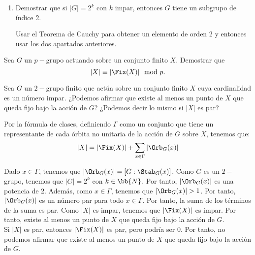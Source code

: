 \begin{ejercicio}
\begin{enumerate}
        
        \item Demostrar que si $|G| = 2^k$ con $k$ impar, entonces $G$ tiene un subgrupo de índice 2.
        \begin{observacion}
            Usar el Teorema de Cauchy para obtener un elemento de orden 2 y entonces usar los dos apartados anteriores.
        \end{observacion}
    \end{enumerate}

\end{ejercicio}

\begin{ejercicio}\label{ej:6.12}
    Sea $G$ un $p-$grupo actuando sobre un conjunto finito $X$. Demostrar que
    \[
        |X| \equiv |\Fix(X)| \mod p.
    \]

\end{ejercicio}

\begin{ejercicio}
    Sea $G$ un $2-$grupo finito que actúa sobre un conjunto finito $X$ cuya cardinalidad es un número impar. ¿Podemos afirmar que existe al menos un punto de $X$ que queda fijo bajo la acción de $G$? ¿Podemos decir lo mismo si $|X|$ es par?

    Por la fórmula de clases, definiendo $\Gamma$ como un conjunto que tiene un representante de cada órbita no unitaria de la acción de $G$ sobre $X$, tenemos que:
    \begin{equation*}
        |X| = |\Fix(X)| + \sum_{x\in \Gamma} |\Orb_G(x)|
    \end{equation*}

    Dado $x\in \Gamma$, tenemos que $|\Orb_G(x)|=[G:\Stab_G(x)]$. Como $G$ es un $2-$grupo, tenemos que $|G|=2^k$ con $k\in \bb{N}$. Por tanto, $|\Orb_G(x)|$ es una potencia de $2$. Además, como $x\in \Gamma$, tenemos que $|\Orb_G(x)|>1$. Por tanto, $|\Orb_G(x)|$ es un número par para todo $x\in \Gamma$. Por tanto, la suma de los términos de la suma es par. Como $|X|$ es impar, tenemos que $|\Fix(X)|$ es impar. Por tanto, existe al menos un punto de $X$ que queda fijo bajo la acción de $G$.\\

    Si $|X|$ es par, entonces $|\Fix(X)|$ es par, pero podría ser $0$. Por tanto, no podemos afirmar que existe al menos un punto de $X$ que queda fijo bajo la acción de $G$.
\end{ejercicio}

